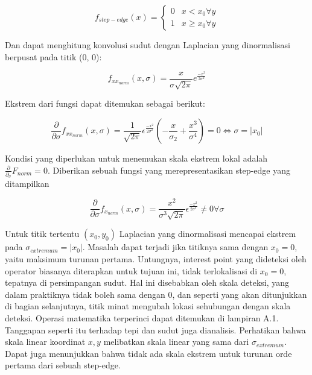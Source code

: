 \begin{equation*}
  f_{step-edge}(x) =
  \begin{cases}
    0 & x < x_{0} \forall y \\
    1 & x \geq x_{0} \forall y
  \end{cases}
\end{equation*}

Dan dapat menghitung konvolusi sudut dengan Laplacian yang dinormalisasi berpusat pada titik (0, 0):

\begin{equation*}
  f_{x x_{norm}}(x,\sigma) = \frac{x}{\sigma \sqrt{2\pi}}e^{\frac{-x^{2}}{2\sigma^{2}}}
\end{equation*}

Ekstrem dari fungsi dapat ditemukan sebagai berikut:

\begin{equation}
  \frac{\partial}{\partial \sigma} f_{xx_{norm}}(x,\sigma) = \frac{1}{\sqrt{2\pi}}\epsilon^{\frac{-x^{2}}{2\sigma^{2}}}(-\frac{x}{\sigma_{2}} + \frac{x^{3}}{\sigma^{4}}) = 0 \Leftrightarrow \sigma = \left\lvert x_{0}\right\rvert 
\end{equation}

Kondisi yang diperlukan untuk menemukan skala ekstrem lokal adalah \(\frac{\partial}{\partial_{\sigma}}F_{norm} = 0\). 
Diberikan sebuah fungsi yang merepresentasikan step-edge yang ditampilkan 

\begin{equation}
\frac{\partial}{\partial \sigma}f_{x_{norm}}(x,\sigma) = \frac{x^{2}}{\sigma^{3}\sqrt{2\pi}}\epsilon^{\frac{-x^{2}}{2\sigma^{2}}} \neq 0\forall\sigma 
\end{equation}

Untuk titik tertentu \((x_{0},y_{0})\) Laplacian yang dinormalisasi mencapai ekstrem pada \(\sigma_{extremum}= \left\lvert x_{0}\right\rvert\). 
Masalah dapat terjadi jika titiknya sama dengan \(x_{0} = 0\), yaitu maksimum turunan pertama. Untungnya, interest point yang dideteksi oleh operator biasanya 
diterapkan untuk tujuan ini, tidak terlokalisasi di \(x_{0} =0\), tepatnya di persimpangan sudut. Hal ini disebabkan oleh skala deteksi, yang dalam praktiknya 
tidak boleh sama dengan \(0\), dan seperti yang akan ditunjukkan di bagian selanjutnya, titik minat mengubah lokasi sehubungan dengan skala deteksi. Operasi matematika 
terperinci dapat ditemukan di lampiran A.1. Tanggapan seperti itu terhadap tepi dan sudut juga dianalisis. Perhatikan bahwa skala linear koordinat \(x,y\) melibatkan skala linear yang sama dari \(\sigma_{extremum}\). 
Dapat juga menunjukkan bahwa tidak ada skala ekstrem untuk turunan orde pertama dari sebuah step-edge.



